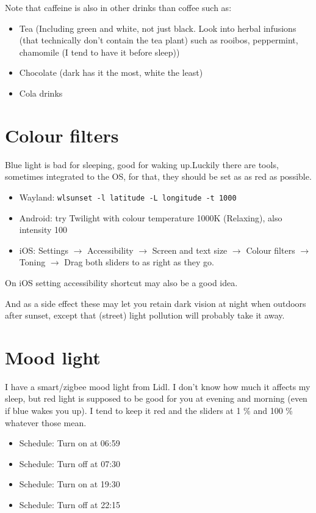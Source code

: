 \documentclass[a4paper]{rapport3}
\begin{document}
Note that caffeine is also in other drinks than coffee such as:

\begin{itemize}
    \item Tea (Including green and white, not just black. Look into herbal infusions (that technically don't contain the tea plant) such as rooibos, peppermint, chamomile (I tend to have it before sleep))
    \item Chocolate (dark has it the most, white the least)
    \item Cola drinks
\end{itemize}

\chapter{Colour filters}

Blue light is bad for sleeping, good for waking up.Luckily there are tools, sometimes integrated to the OS, for that, they should be set as as red as possible.

\begin{itemize}
    \item Wayland: \texttt{wlsunset -l latitude -L longitude -t 1000}
    \item Android: try Twilight with colour temperature 1000K (Relaxing), also intensity 100 %
    \item iOS: Settings $\rightarrow$ Accessibility $\rightarrow$ Screen and text size $\rightarrow$ Colour filters $\rightarrow$ Toning $\rightarrow$ Drag both sliders to as right as they go.
\end{itemize}

On iOS setting accessibility shortcut may also be a good idea.

And as a side effect these may let you retain dark vision at night when outdoors after sunset, except that (street) light pollution will probably take it away.

\chapter{Mood light}

I have a smart/zigbee mood light from Lidl. I don't know how much it affects my sleep, but red light is supposed to be good for you at evening and morning (even if blue wakes you up).
I tend to keep it red and the sliders at 1 \% and 100 \% whatever those mean.

\begin{itemize}
    \item Schedule: Turn on at 06:59
    \item Schedule: Turn off at 07:30
    \item Schedule: Turn on at 19:30
    \item Schedule: Turn off at 22:15
\end{itemize}
\end{document}
